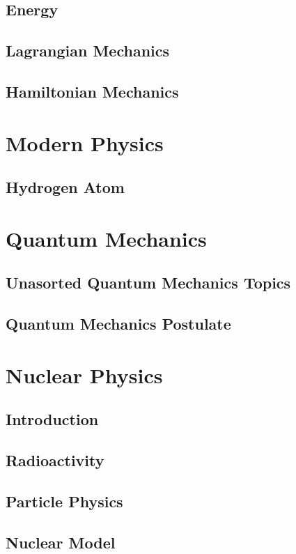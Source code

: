 \documentclass[10pt]{report}
\begin{document}
\section{Energy}
\clearpage

\section{Lagrangian Mechanics}
\clearpage
\clearpage

\section{Hamiltonian Mechanics}
\clearpage
\clearpage

\chapter{Modern Physics}\clearpage
\section{Hydrogen Atom}
\clearpage

\chapter{Quantum Mechanics}\clearpage
\section{Unasorted Quantum Mechanics Topics}
\clearpage
\clearpage

\section{Quantum Mechanics Postulate}
\clearpage
\clearpage

\chapter{Nuclear Physics}\clearpage
\section{Introduction}
\clearpage

\section{Radioactivity}
\clearpage

\section{Particle Physics}
\clearpage

\section{Nuclear Model}
\clearpage

\nocite{*}
\printbibliography
\end{document}
